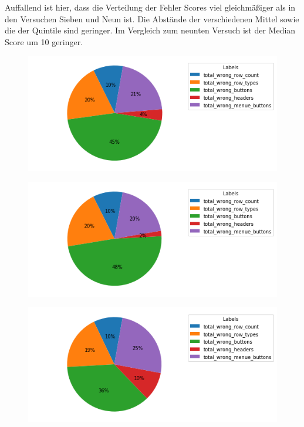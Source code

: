 \documentclass[pdftex,a4paper,halfparskip, article]{scrartcl}
\begin{document}
Auffallend ist hier, dass die Verteilung der Fehler Scores viel gleichmäßiger als in den Versuchen Sieben und Neun ist. Die Abstände der verschiedenen Mittel sowie die der Quintile sind geringer. Im Vergleich zum neunten Versuch ist der Median Score um 10 geringer. 

\begin{figure}
\centering
\begin{minipage}{.5\textwidth}
  \centering
  \includegraphics[width=1\linewidth]{predictions_bin13_total_error_types_pie_chart}
  \label{fig:fehler_gesamt_bin13}
\end{minipage}%
\begin{minipage}{.5\textwidth}
  \centering
  \includegraphics[width=1\linewidth]{predictions_bin13_excluded_p80_error_types_pie_chart}
  \label{fig:fehler_beste80_bin13}
\end{minipage}
\begin{minipage}{.5\textwidth}
  \centering
   \includegraphics[width=1\linewidth]{predictions_bin13_p80_error_types_pie_chart}
  \label{fig:fehler_schlechteste20_bin13}
\end{minipage}%
\end{figure}
\end{document}
